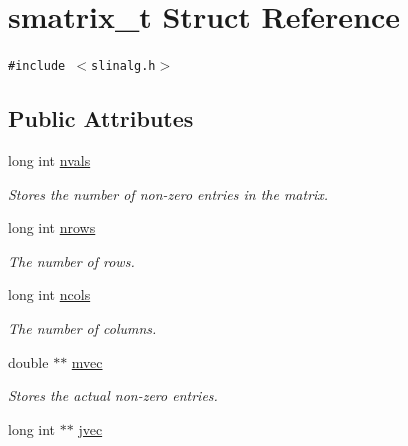 \hypertarget{structsmatrix__t}{
\section{smatrix\_\-t Struct Reference}
\label{structsmatrix__t}
}
{\tt \#include $<$slinalg.h$>$}

\subsection*{Public Attributes}
\begin{CompactItemize}
\item 
\hypertarget{structsmatrix__t_1032ba2ab997a926e802b783059f45e5}{
long int \hyperlink{structsmatrix__t_1032ba2ab997a926e802b783059f45e5}{nvals}}
\label{structsmatrix__t_1032ba2ab997a926e802b783059f45e5}

\begin{CompactList}\small\item\em Stores the number of non-zero entries in the matrix. \item\end{CompactList}\item 
\hypertarget{structsmatrix__t_18f7a7bdcd24c4499e54101d2f1b3752}{
long int \hyperlink{structsmatrix__t_18f7a7bdcd24c4499e54101d2f1b3752}{nrows}}
\label{structsmatrix__t_18f7a7bdcd24c4499e54101d2f1b3752}

\begin{CompactList}\small\item\em The number of rows. \item\end{CompactList}\item 
\hypertarget{structsmatrix__t_453404b899ac861fce92c4f0636ca0a5}{
long int \hyperlink{structsmatrix__t_453404b899ac861fce92c4f0636ca0a5}{ncols}}
\label{structsmatrix__t_453404b899ac861fce92c4f0636ca0a5}

\begin{CompactList}\small\item\em The number of columns. \item\end{CompactList}\item 
\hypertarget{structsmatrix__t_462ede94ee2abaa8f69a934960c23091}{
double $\ast$$\ast$ \hyperlink{structsmatrix__t_462ede94ee2abaa8f69a934960c23091}{mvec}}
\label{structsmatrix__t_462ede94ee2abaa8f69a934960c23091}

\begin{CompactList}\small\item\em Stores the actual non-zero entries. \item\end{CompactList}\item 
\hypertarget{structsmatrix__t_9198484960dba536a0dd7e160267b5b6}{
long int $\ast$$\ast$ \hyperlink{structsmatrix__t_9198484960dba536a0dd7e160267b5b6}{jvec}}
\label{structsmatrix__t_9198484960dba536a0dd7e160267b5b6}


\end{CompactItemize}
